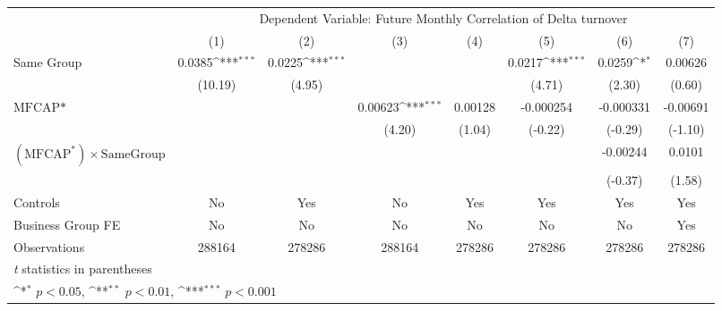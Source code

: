 {
\def\sym#1{\ifmmode^{#1}\else\(^{#1}\)\fi}
\begin{tabular}{l*{7}{c}}
\hline\hline
                &\multicolumn{7}{c}{Dependent Variable:  Future Monthly Correlation of Delta turnover}                                               \\\cmidrule(lr){2-8}
                &\multicolumn{1}{c}{(1)}         &\multicolumn{1}{c}{(2)}         &\multicolumn{1}{c}{(3)}         &\multicolumn{1}{c}{(4)}         &\multicolumn{1}{c}{(5)}         &\multicolumn{1}{c}{(6)}         &\multicolumn{1}{c}{(7)}         \\
\hline
Same Group      &   0.0385\sym{***}&   0.0225\sym{***}&                  &                  &   0.0217\sym{***}&   0.0259\sym{*}  &  0.00626         \\
                &  (10.19)         &   (4.95)         &                  &                  &   (4.71)         &   (2.30)         &   (0.60)         \\
[1em]
$ \text{MFCAP*} $&                  &                  &  0.00623\sym{***}&  0.00128         &-0.000254         &-0.000331         & -0.00691         \\
                &                  &                  &   (4.20)         &   (1.04)         &  (-0.22)         &  (-0.29)         &  (-1.10)         \\
[1em]
 $ (\text{MFCAP}^*) \times {\text{SameGroup} }  $ &                  &                  &                  &                  &                  & -0.00244         &   0.0101         \\
                &                  &                  &                  &                  &                  &  (-0.37)         &   (1.58)         \\
\hline
Controls        &       No         &      Yes         &       No         &      Yes         &      Yes         &      Yes         &      Yes         \\
Business Group FE&       No         &       No         &       No         &       No         &       No         &       No         &      Yes         \\
Observations    &   288164         &   278286         &   288164         &   278286         &   278286         &   278286         &   278286         \\
\hline\hline
\multicolumn{8}{l}{\footnotesize \textit{t} statistics in parentheses}\\
\multicolumn{8}{l}{\footnotesize \sym{*} \(p<0.05\), \sym{**} \(p<0.01\), \sym{***} \(p<0.001\)}\\
\end{tabular}
}
